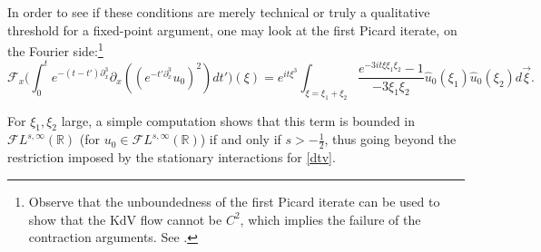 \documentclass[a4paper,
11pt,  reqno]{amsart}
\newcommand{\5}{\textup{V}}
\newcommand{\dx}{\partial_x}
\theoremstyle{remark}
\newcommand{\R}{\mathbb{R}}
\newcommand{\Ft}{{\mathcal{F}}}
\numberwithin{equation}{section}
\numberwithin{theorem}{section}
\begin{document}
	\medskip
	In order to see if these conditions are merely technical or truly a qualitative threshold for a fixed-point argument, one may look at the {first Picard iterate}, on the Fourier side:\footnote{Observe that the unboundedness of the first Picard iterate can be used to show that the KdV flow cannot be $C^2$, which implies the failure of the contraction arguments. See  \cite{bou_ill_kdv, MolTzeSaut_ill, Tzvetkov_ill}.}
	\begin{equation}\label{picard1}
\Ft_x\bigg(
	\int_0^t e^{-(t-t')\dx^3}\partial_x((e^{-t'\dx^3}u_0)^2)dt'
\bigg) (\xi)
=
e^{it \xi^3}
\int_{\xi=\xi_1+\xi_2}\frac{e^{-3it\xi\xi_1\xi_2}-1}{-3\xi_1\xi_2} \widehat{u}_0( \xi_1) \widehat{u}_0(\xi_2) d\vec{\xi}.
\end{equation}

	For $\xi_1, \xi_2$ large,
	a simple computation shows that this term is bounded in $\mathcal{F}L^{s,\infty}(\R)$ (for $u_0\in \mathcal{F}L^{s,\infty}(\R)$) if and only if $s>-\frac12$, thus going beyond the restriction imposed by the stationary interactions for \eqref{dtv}.
\end{document}
